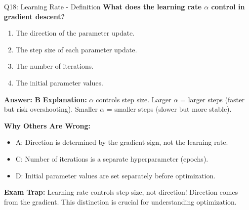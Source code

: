 \documentclass[8pt]{beamer}
\begin{document}
	\begin{frame}{Q18: Learning Rate - Definition}
		\fontsize{6.5}{7.5}\selectfont
		\textbf{What does the learning rate $\alpha$ control in gradient descent?}
		
		\begin{enumerate}
			\item The direction of the parameter update.
			\item The step size of each parameter update.
			\item The number of iterations.
			\item The initial parameter values.
		\end{enumerate}
		
		\vspace{0.05cm}
		\textcolor{myblue}{\textbf{Answer: B}}
		\vspace{0.05cm}
		\textcolor{myblue}{\textbf{Explanation:}} $\alpha$ controls step size. Larger $\alpha$ = larger steps (faster but risk overshooting). Smaller $\alpha$ = smaller steps (slower but more stable).
		
		\vspace{0.05cm}
		\textcolor{myred}{\textbf{Why Others Are Wrong:}}
		\begin{itemize}
			\item \textcolor{myred}{A:} Direction is determined by the gradient sign, not the learning rate.
			\item \textcolor{myred}{C:} Number of iterations is a separate hyperparameter (epochs).
			\item \textcolor{myred}{D:} Initial parameter values are set separately before optimization.
		\end{itemize}
		
		\textcolor{myred}{\textbf{Exam Trap:}} Learning rate controls \textcolor{myblue}{step size}, not direction! Direction comes from the gradient. This distinction is crucial for understanding optimization.
	\end{frame}
	
\end{document}
